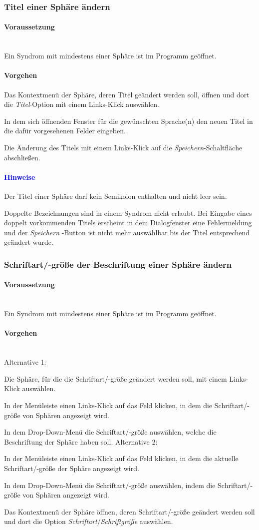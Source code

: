 \documentclass[enabledeprecatedfontcommands,fontsize=11pt,paper=a4,twoside]{scrartcl}
\newcounter{one}
\newcounter{two}[one]
\newcommand*{\hint}{\paragraph{\textcolor{blue}{Hinweise}}}
\newcommand*{\condition}{\paragraph{Voraussetzung}$\;$ \vspace{0.2cm}\\}
\newcommand*{\actions}{\paragraph{Vorgehen} $\;$\vspace{0.2cm}\\}
\newcommand*{\action}{\paragraph{Vorgehen}}
\newcommand*{\aOne}{\textcolor{bbe}{Alternative 1:}}
\newcommand*{\aTwo}{\textcolor{bbe}{Alternative 2:}}
\let\tempone\itemize
\let\temptwo\enditemize
\renewenvironment{itemize}{\tempone\addtolength{\itemsep}{-10.0pt}}{\temptwo}
\let\origenumerate\enumerate
\let\origendenumerate\endenumerate
\renewenvironment{enumerate}{\origenumerate \addtolength{\itemsep}{-10.0pt}}{\origendenumerate}
\begin{document}
\subsubsection{Titel einer Sphäre ändern}
				\condition 	
		Ein Syndrom mit mindestens einer Sphäre ist im Programm geöffnet. 
		\action  
		\begin{enumerate}
			\item Das Kontextmenü der Sphäre, deren Titel geändert werden soll, öffnen und dort die \textit{Titel}-Option mit einem Links-Klick auswählen. 
			\item In dem sich öffnenden Fenster für die gewünschten Sprache(n) den neuen Titel in die dafür vorgesehenen Felder eingeben.
			\item Die Änderung des Titels mit einem Links-Klick auf die \textit{Speichern}-Schaltfläche abschließen.
		\end{enumerate}
		\hint
		\begin{itemize}
			\item Der Titel einer Sphäre darf kein Semikolon enthalten und nicht leer sein.
			\item Doppelte Bezeichnungen sind in einem Syndrom nicht erlaubt. Bei Eingabe eines doppelt vorkommenden Titels erscheint in dem Dialogfenster eine Fehlermeldung und der \textit{Speichern} -Button ist nicht mehr auswählbar bis der Titel entsprechend geändert wurde. \\
		\end{itemize}	
			
\subsubsection{Schriftart/-größe der Beschriftung einer Sphäre ändern}
		\condition 	
		Ein Syndrom mit mindestens einer Sphäre ist im Programm geöffnet. 
		\actions  
		\aOne
		\begin{enumerate}
			\item Die Sphäre, für die die Schriftart/-größe geändert werden soll, mit einem Links-Klick auswählen.
			\item In der Menüleiste einen Links-Klick auf das Feld klicken, in dem die Schriftart/-größe von Sphären angezeigt wird.
			\item In dem Drop-Down-Menü die Schriftart/-größe auswählen, welche die Beschriftung der Sphäre haben soll.
		\end{enumerate}
		\aTwo
		\begin{enumerate}
			\item In der Menüleiste einen Links-Klick auf das Feld klicken, in dem die aktuelle Schriftart/-größe der Sphäre angezeigt wird.
			\item In dem Drop-Down-Menü die Schriftart/-größe auswählen, indem die Schriftart/-größe von Sphären angezeigt wird.
			\item Das Kontextmenü der Sphäre öffnen, deren Schriftart/-größe geändert werden soll und dort die Option \textit{Schriftart}/\textit{Schriftgröße} auswählen. \\
		\end{enumerate}
			
\end{document}
